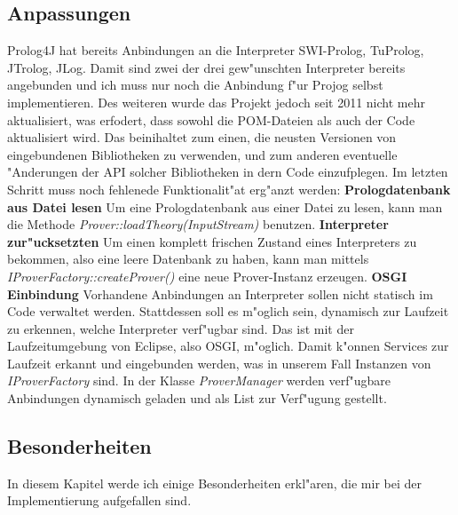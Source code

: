 \subsection{Anpassungen}
Prolog4J hat bereits Anbindungen an die Interpreter SWI-Prolog, TuProlog, JTrolog, JLog. Damit sind zwei der drei gew"unschten Interpreter bereits angebunden und ich muss nur noch  die Anbindung f"ur Projog selbst implementieren. Des weiteren wurde das Projekt jedoch seit 2011 nicht mehr aktualisiert, was erfodert, dass sowohl die POM-Dateien als auch der Code aktualisiert wird. Das beinihaltet zum einen, die neusten Versionen von eingebundenen Bibliotheken zu verwenden, und zum anderen eventuelle "Anderungen der API solcher Bibliotheken in dern Code einzufplegen. Im letzten Schritt muss noch fehlenede Funktionalit"at erg"anzt werden:\newline
\newline
\textbf{Prologdatenbank aus Datei lesen} Um eine Prologdatenbank aus einer Datei zu lesen, kann man die Methode \emph{Prover::loadTheory(InputStream)} benutzen.\newline
\textbf{Interpreter zur"ucksetzten} Um einen komplett frischen Zustand eines Interpreters zu bekommen, also eine leere Datenbank zu haben, kann man mittels \emph{IProverFactory::createProver()} eine neue Prover-Instanz erzeugen.\newline
\textbf{OSGI Einbindung} Vorhandene Anbindungen an Interpreter sollen nicht statisch im Code verwaltet werden. Stattdessen soll es m"oglich sein, dynamisch zur Laufzeit zu erkennen, welche Interpreter verf"ugbar sind. Das ist mit der Laufzeitumgebung von Eclipse, also OSGI, m"oglich. Damit k"onnen Services zur Laufzeit erkannt und eingebunden werden, was  in unserem Fall Instanzen von \emph{IProverFactory} sind. In der Klasse \emph{ProverManager} werden verf"ugbare Anbindungen dynamisch geladen und als List zur Verf"ugung gestellt.

\subsection{Besonderheiten}
In diesem Kapitel werde ich einige Besonderheiten erkl"aren, die mir bei der Implementierung aufgefallen sind.

